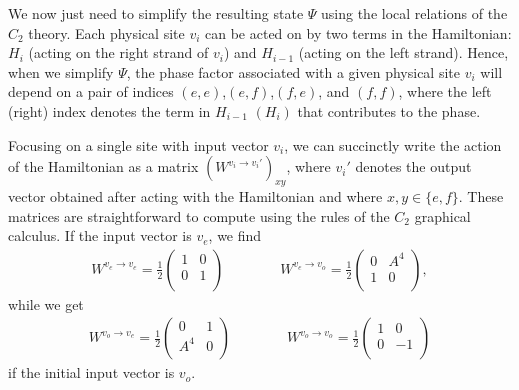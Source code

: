 We now just need to simplify the resulting state $\Psi$ using the local relations of the $C_2$ theory. 
Each physical site $v_i$ can be acted on by two terms in the Hamiltonian: $H_i$ (acting on the right strand of $v_i$) and $H_{i-1}$ (acting on the left strand). 
Hence, when we simplify $\Psi$, the phase factor associated with a given physical site $v_i$ will depend on a pair of indices $(e,e)$,$(e,f)$,$(f,e)$, and $(f,f)$, where 
the left (right) index denotes the term in $H_{i-1}$ $(H_i)$ that contributes to the phase.

Focusing on a single site with input vector $v_i$, 
we can succinctly write the action of the Hamiltonian as a matrix $(W^{v_i \to v_i'})_{xy}$, where $v_i'$ denotes the output vector obtained after acting with the Hamiltonian and where $x,y \in \{ e, f \}$.
These matrices are straightforward to compute using the rules of the $C_2$ graphical calculus.
If the input vector is $v_e$, we find
\begin{align}
W^{v_e \to v_e} = 
\frac{1}{2}\left( \begin{matrix} 
1 & 0\\
0 & 1 \\
\end{matrix} \right) \quad \quad \quad \quad 
W^{v_e \to v_o} = 
\frac{1}{2}\left( \begin{matrix} 
0& A^4\\
1 & 0 \\
\end{matrix} \right),
\end{align}
while we get
\begin{align}
W^{v_o \to v_e} = 
\frac{1}{2}\left( \begin{matrix} 
0 & 1\\
A^4 & 0\\
\end{matrix} \right) \quad \quad \quad \quad 
W^{v_o \to v_o} = 
\frac{1}{2}\left( \begin{matrix} 
1& 0\\
0 & -1 \\
\end{matrix} \right)
\end{align}
if the initial input vector is $v_o$.


